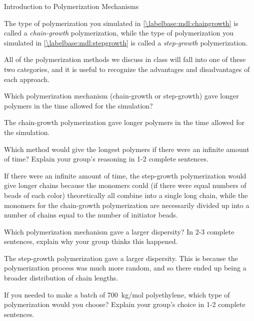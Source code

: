 \begin{activity}{Introduction to Polymerization Mechanisms}
\begin{ctqs}
\end{ctqs}

\begin{infobox}
	The type of polymerization you simulated in \ref{\labelbase:mdl:chaingrowth} is called a \emph{chain-growth} polymerization, while the type of polymerization you simulated in  \ref{\labelbase:mdl:stepgrowth} is called a \emph{step-growth} polymerization.
	
	All of the polymerization methods we discuss in class will fall into one of these two categories, and it is useful to recognize the advantages and disadvantages of each approach.
\end{infobox}

\begin{ctqs}
	\question Which polymerization mechanism (chain-growth or step-growth) gave longer polymers in the time allowed for the simulation?
	
		\begin{solution}[1in]
			The chain-growth polymerization gave longer polymers in the time allowed for the simulation.
		\end{solution}
	
	\question Which method would give the longest polymers if there were an infinite amount of time?  Explain your group's reasoning in 1-2 complete sentences.
	
		\begin{solution}[1.75in]
			If there were an infinite amount of time, the step-growth polymerization would give longer chains because the monomers could (if there were equal numbers of beads of each color) theoretically all combine into a single long chain, while the monomers for the chain-growth polymerization are necessarily divided up into a number of chains equal to the number of initiator beads.
		\end{solution}
	
	\question Which polymerization mechanism gave a larger dispersity?  In 2-3 complete sentences, explain why your group thinks this happened.
	
		\begin{solution}[1.75in]
			The step-growth polymerization gave a larger dispersity.  This is because the polymerization process was much more random, and so there ended up being a broader distribution of chain lengths.
		\end{solution}
	
	\question If you needed to make a batch of 700~kg/mol polyethylene, which type of polymerization would you choose?  Explain your group's choice in 1-2 complete sentences.
	

\end{ctqs}
\end{activity}
